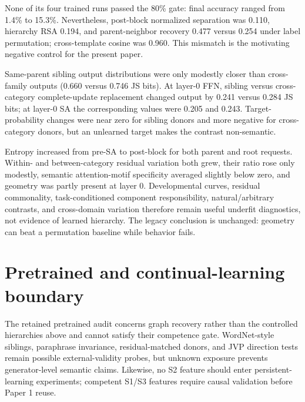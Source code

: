 \documentclass[10pt]{article}
\begin{document}
None of its four trained runs passed the 80\% gate: final accuracy ranged from 1.4\% to 15.3\%.  Nevertheless, post-block normalized separation was 0.110, hierarchy RSA 0.194, and parent-neighbor recovery 0.477 versus 0.254 under label permutation; cross-template cosine was 0.960.  This mismatch is the motivating negative control for the present paper.

Same-parent sibling output distributions were only modestly closer than cross-family outputs (0.660 versus 0.746 JS bits).  At layer-0 FFN, sibling versus cross-category complete-update replacement changed output by 0.241 versus 0.284 JS bits; at layer-0 SA the corresponding values were 0.205 and 0.243.  Target-probability changes were near zero for sibling donors and more negative for cross-category donors, but an unlearned target makes the contrast non-semantic.

Entropy increased from pre-SA to post-block for both parent and root requests.  Within- and between-category residual variation both grew, their ratio rose only modestly, semantic attention-motif specificity averaged slightly below zero, and geometry was partly present at layer 0.  Developmental curves, residual commonality, task-conditioned component responsibility, natural/arbitrary contrasts, and cross-domain variation therefore remain useful underfit diagnostics, not evidence of learned hierarchy.  The legacy conclusion is unchanged: geometry can beat a permutation baseline while behavior fails.

\section{Pretrained and continual-learning boundary}
The retained pretrained audit concerns graph recovery rather than the controlled hierarchies above and cannot satisfy their competence gate.  WordNet-style siblings, paraphrase invariance, residual-matched donors, and JVP direction tests remain possible external-validity probes, but unknown exposure prevents generator-level semantic claims.  Likewise, no S2 feature should enter persistent-learning experiments; competent S1/S3 features require causal validation before Paper 1 reuse.
\end{document}
